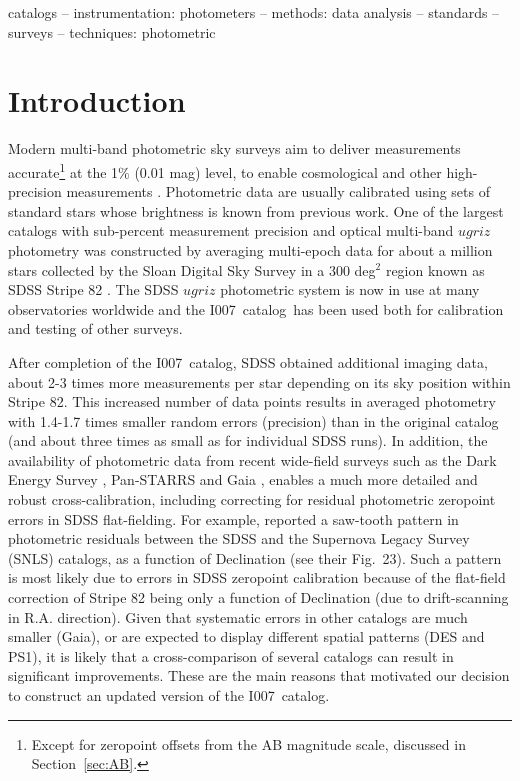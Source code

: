 \documentclass[fleqn,usenatbib]{mnras}
\newcommand{\pO}{\hbox{I007}}
\newcommand{\pOc}{\hbox{I007 catalog}}
\begin{document}
\begin{keywords}
catalogs -- instrumentation: photometers -- methods: data analysis -- standards -- surveys --
techniques: photometric
\end{keywords}



\section{Introduction} \label{sec:intro}

Modern multi-band photometric sky surveys aim to deliver measurements accurate\footnote{Except for zeropoint offsets from the AB magnitude scale, discussed in Section~\ref{sec:AB}.} at the 1\% (0.01 mag) level, to enable cosmological and other high-precision measurements \cite[e.g., the Vera C. Rubin Observatory Legacy Survey of Space and Time,][]{LSSToverview}. Photometric data are usually calibrated using sets of standard stars whose brightness is known from previous work. One of the largest catalogs with sub-percent measurement precision and optical multi-band $ugriz$ photometry
was constructed by averaging multi-epoch data for about a million stars collected by the Sloan Digital Sky Survey \citep[SDSS,][]{York2000}  in a 300 deg$^2$ region known as SDSS Stripe 82 \citep[][hereafter \pO]{Ivez07}. The SDSS $ugriz$ photometric system is now in use at many observatories worldwide and the \pOc\ has been used both for calibration and testing of other surveys. 

After completion of the \pOc, SDSS obtained additional imaging data, about 2-3 times more measurements 
per star depending on its sky position within Stripe 82. This increased number of data points results in averaged photometry with
1.4-1.7 times smaller random errors (precision) than in the original catalog (and about three times as small as for individual 
SDSS runs). In addition, the availability of photometric data from recent wide-field surveys such as the 
Dark Energy Survey \citep[DES,][]{2016MNRAS.460.1270D}, Pan-STARRS \citep[PS1,][]{2010SPIE.7733E..0EK} and Gaia \citep{GaiaCollab2018b}, enables a much more detailed and robust cross-calibration, including
correcting for residual photometric zeropoint errors in SDSS flat-fielding. For example, \cite{2013A&A...552A.124B}
reported a saw-tooth pattern in photometric residuals between the SDSS and the Supernova Legacy Survey (SNLS) catalogs, as a function of Declination (see their Fig.~23). Such a pattern is most likely due to errors in SDSS zeropoint calibration because
of the flat-field correction of Stripe 82 being only a function of Declination (due to drift-scanning in R.A. direction). 
Given that systematic errors in other catalogs are much smaller (Gaia), or are expected to display different 
spatial patterns (DES and PS1), it is likely that a cross-comparison of several catalogs can result in
significant improvements. These are the main reasons that motivated our decision to construct an updated version of the \pOc. 
 
\end{document}
